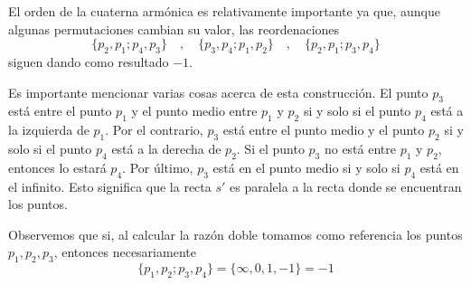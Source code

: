 El orden de la cuaterna armónica es relativamente importante ya que, aunque algunas permutaciones cambian su valor, las reordenaciones
\begin{equation*}
	\{p_2,p_1;p_4,p_3\} \quad , \quad \{p_3,p_4;p_1,p_2\}\quad , \quad \{p_2,p_1;p_3,p_4\}
\end{equation*}
siguen dando como resultado $-1$.

Es importante mencionar varias cosas acerca de esta construcción. El punto $p_3$ está entre el punto $p_1$ y el punto medio entre $p_1$ y $p_2$ si y solo si el punto $p_4$ está a la izquierda de $p_1$. Por el contrario, $p_3$ está entre el punto medio y el punto $p_2$  si y solo si el punto $p_4$ está a la derecha de $p_2$. Si el punto $p_3$ no está entre $p_1$ y $p_2$, entonces lo estará $p_4$. Por último, $p_3$ está en el punto medio si y solo si $p_4$ está en el infinito. Esto significa que la recta $s'$ es paralela a la recta donde se encuentran los puntos.

Observemos que si, al calcular la razón doble tomamos como referencia los puntos $p_1,p_2,p_3$, entonces necesariamente
\begin{equation*}
	\{p_1,p_2;p_3,p_4\}=\{\infty,0,1,-1\}=-1
\end{equation*}

